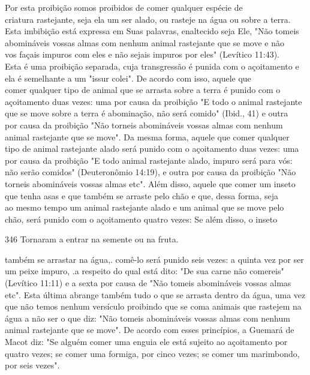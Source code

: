 \begin{itemize}
\begin{enumrate}
\begin{itemize}
\begin{itemize}
\begin{itemize}
Por esta proibição somos proibidos de comer qualquer espécie de\\
criatura rastejante, seja ela um ser alado, ou rasteje na água ou sobre
a terra.\\
Esta imbibição está expressa em Suas palavras, enaltecido seja Ele, "Não
tomeis\\
abomináveis vossas almas com nenhum animal rastejante que se move e
não\\
vos façais impuros com eles e não sejais impuros por eles" (Levítico
11:43).\\
Esta é uma proibição separada, cuja transgressão é punida com o açoitamento
e ela é semelhante a um "issur colei". De acordo com isso,
aquele que\\
comer qualquer tipo de animal que se arrasta sobre a terra é punido com
o açoitamento
duas vezes: uma por causa da proibição "E todo o animal
rastejante\\
que se move sobre a terra é abominação, não será comido" (Ibid., 41) e
outra\\
por causa da proibição "Não torneis abomináveis vossas almas com
nenhum\\
animal rastejante que se move". Da mesma forma, aquele que comer
qualquer\\
tipo de animal rastejante alado será punido com o açoitamento duas
vezes: uma\\
por causa da proibição "E todo animal rastejante alado, impuro será para
vós:\\
não serão comidos" (Deuteronômio 14:19), e outra por causa da proibição
"Não\\
torneis abomináveis vossas almas etc". Além disso, aquele que comer um
inseto
que tenha asas e que também se arraste pelo chão e que, dessa forma,
seja\\
ao mesmo tempo um animal rastejante alado e um animal que se move pelo\\
chão, será punido com o açoitamento quatro vezes: Se além disso, o
inseto


346 Tornaram a entrar na semente ou na fruta.


também se arrastar na água,. comê-lo será punido seis vezes: a quinta
vez por ser um peixe impuro, .a respeito do qual está dito: "De sua
carne não come­reis" (Levítico 11:11) e a sexta por causa de "Não tomeis
abomináveis vossas almas etc". Esta última abrange também tudo o que se
arrasta dentro da água, uma vez que não temos nenhum versículo proibindo
que se coma animais que rastejem na água a não ser o que diz: "Não
tomeis abomináveis vossas almas com nenhum animal rastejante que se
move". De acordo com esses princípios, a Guemará de Macot diz: "Se
alguém comer uma enguia ele está sujeito ao açoi­tamento por quatro
vezes; se comer uma formiga, por cinco vezes; se comer um marimbondo,
por seis vezes".


\end{itemize}
\end{itemize}
\end{itemize}
\end{enumrate}
\end{itemize}
